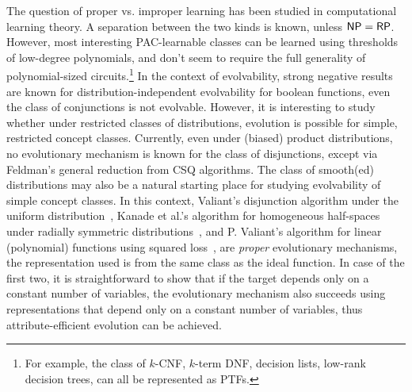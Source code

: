 The question of proper vs. improper learning has been studied in computational
learning theory. A separation between the two kinds is known, unless $\mathsf{NP} =
\mathsf{RP}$. However, most interesting PAC-learnable classes can be learned using
thresholds of low-degree polynomials, and don't seem to require the full
generality of polynomial-sized circuits.\footnote{For example, the class of
$k$-CNF, $k$-term DNF, decision lists, low-rank decision trees, can all be
represented as PTFs.} In the context of evolvability, strong negative results
are known for distribution-independent evolvability for boolean functions, \eg
even the class of conjunctions is not evolvable. However, it is interesting to
study whether under restricted classes of distributions, evolution is possible
for simple, restricted concept classes. Currently, even under (biased) product
distributions, no evolutionary mechanism is known for the class of disjunctions,
except via Feldman's general reduction from CSQ algorithms. The class of
smooth(ed) distributions may also be a natural starting place for studying
evolvability of simple concept classes. In this context, Valiant's disjunction
algorithm under the uniform distribution~\cite{Valiant:2009-evolvability},
Kanade et al.'s algorithm for homogeneous half-spaces under radially symmetric
distributions~\cite{KVV:2010-drift}, and P. Valiant's algorithm for linear
(polynomial) functions using squared loss~\cite{Valiant:2012-real}, are
\emph{proper} evolutionary mechanisms, \ie the representation used is from the
same class as the ideal function. In case of the first two, it is
straightforward to show that if the target depends only on a constant number of
variables, the evolutionary mechanism also succeeds using representations that
depend only on a constant number of variables, thus attribute-efficient
evolution can be achieved.

